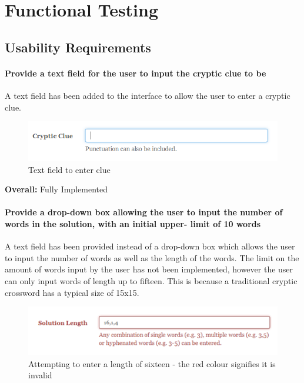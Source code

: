 \section{Functional Testing}
\label{sec:functional_testing}

\subsection{Usability Requirements}
\label{sub:test_func_usability}

 \paragraph{Provide a text field for the user to input the cryptic clue to be}
  A text field has been added to the interface to allow the user to enter a cryptic clue. 
\begin{figure}[H]
	\centering
	 \includegraphics[keepaspectratio=true]{evidence/enterclue.png}
	\caption{Text field to enter clue}
\end{figure}

{\bf Overall:} Fully Implemented

 \paragraph{Provide a drop-down box allowing the user to input the
number of words in the solution, with an initial upper-
limit of 10 words}

 A text field has been provided instead of a drop-down box which allows the user
 to input the number of words as well as the length of the words. The limit on the 
amount of words input by the user has not been implemented, however the user 
can only input words of length up to fifteen. This is because a traditional cryptic 
crossword has a typical size of 15x15.

\begin{figure}[H]
	\centering
	\includegraphics[keepaspectratio=true]{evidence/dropdown1.png}
	\caption{Attempting to enter a length of sixteen - the red colour signifies it is invalid}
\end{figure}

